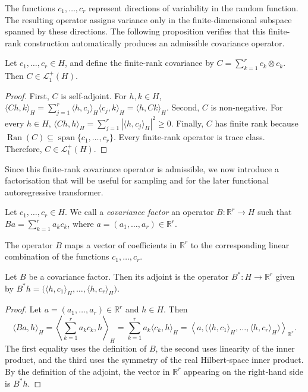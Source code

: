 The functions \(c_1,\ldots,c_r\) represent directions of variability in the random function. The resulting operator assigns variance only in the finite-dimensional subspace spanned by these directions. The following proposition verifies that this finite-rank construction automatically produces an admissible covariance operator.

\begin{proposition}\label{prop:Finite-rank covariance}
Let \(c_1,\ldots,c_r\in H\), and define the finite-rank covariance by \(C=\sum_{k=1}^r c_k\otimes c_k\). Then \(C\in\mathcal L_1^+(H)\).
\end{proposition}

\begin{proof}
First, \(C\) is self-adjoint. For \(h,k\in H\), \(\langle Ch,k\rangle_H
=
\sum_{j=1}^r\langle h,c_j\rangle_H\langle c_j,k\rangle_H
=
\langle h,Ck\rangle_H\). Second, \(C\) is non-negative. For every \(h\in H\), \(\langle Ch,h\rangle_H=\sum_{j=1}^r|\langle h,c_j\rangle_H|^2\geqslant0\). Finally, \(C\) has finite rank because \(\operatorname{Ran}(C)\subseteq\operatorname{span}\{c_1,\ldots,c_r\}\). Every finite-rank operator is trace class. Therefore, \(C\in\mathcal L_1^+(H)\).
\end{proof}

Since this finite-rank covariance operator is admissible, we now introduce a factorisation that will be useful for sampling and for the later functional autoregressive transformer.

\begin{definition}
Let \(c_1,\ldots,c_r\in H\). We call a \emph{covariance factor} an operator \(B:\mathbb R^r\to H\) such that \(Ba=\sum_{k=1}^r a_kc_k\), where \(a=(a_1,\ldots,a_r)\in\mathbb R^r\).
\end{definition}

The operator \(B\) maps a vector of coefficients in \(\mathbb R^r\) to the corresponding linear combination of the functions \(c_1,\ldots,c_r\).

\begin{lemma}
Let \(B\) be a covariance factor. Then its adjoint is the operator \(B^*:H\to\mathbb R^r\) given by \(B^*h=\bigl(\langle h,c_1\rangle_H,\ldots,\langle h,c_r\rangle_H\bigr)\).
\end{lemma}

\begin{proof}
Let \(a=(a_1,\ldots,a_r)\in\mathbb R^r\) and \(h\in H\). Then
\[
\langle Ba,h\rangle_H=\left\langle\sum_{k=1}^ra_kc_k,h\right\rangle_H=\sum_{k=1}^ra_k\langle c_k,h\rangle_H=\left\langle a,\bigl(\langle h,c_1\rangle_H,\ldots,\langle h,c_r\rangle_H\bigr)\right\rangle_{\mathbb R^r}.
\]
The first equality uses the definition of \(B\), the second uses linearity of the inner product, and the third uses the symmetry of the real Hilbert-space inner product. By the definition of the adjoint, the vector in \(\mathbb R^r\) appearing on the right-hand side is \(B^*h\).
\end{proof}

